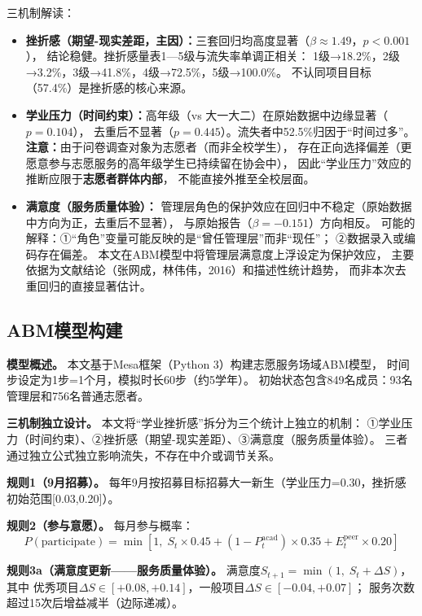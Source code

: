 \documentclass[12pt,a4paper]{article}
\begin{document}
三机制解读：
\begin{itemize}
\item \textbf{挫折感（期望-现实差距，主因）：}三套回归均高度显著（$\beta\approx1.49$，$p<0.001$），
结论稳健。挫折感量表1—5级与流失率单调正相关：
1级→18.2\%，2级→3.2\%，3级→41.8\%，4级→72.5\%，5级→100.0\%。
不认同项目目标（57.4\%）是挫折感的核心来源。
\item \textbf{学业压力（时间约束）：}高年级（vs 大一大二）在原始数据中边缘显著（$p=0.104$），
去重后不显著（$p=0.445$）。流失者中52.5\%归因于“时间过多”。
\textbf{注意：}由于问卷调查对象为志愿者（而非全校学生），
存在正向选择偏差（更愿意参与志愿服务的高年级学生已持续留在协会中），
因此“学业压力”效应的推断应限于\textbf{志愿者群体内部}，
不能直接外推至全校层面。
\item \textbf{满意度（服务质量体验）：}
管理层角色的保护效应在回归中不稳定（原始数据中方向为正，去重后不显著），
与原始报告（$\beta=-0.151$）方向相反。
可能的解释：①“角色”变量可能反映的是“曾任管理层”而非“现任”；
②数据录入或编码存在偏差。
本文在ABM模型中将管理层满意度上浮设定为保护效应，
主要依据为文献结论（张网成，林伟伟，2016）和描述性统计趋势，
而非本次去重回归的直接显著估计。
\end{itemize}

\subsection{ABM模型构建}

\textbf{模型概述。}
本文基于Mesa框架（Python 3）构建志愿服务场域ABM模型，
时间步设定为1步=1个月，模拟时长60步（约5学年）。
初始状态包含849名成员：93名管理层和756名普通志愿者。

\textbf{三机制独立设计。}
本文将“学业挫折感”拆分为三个统计上独立的机制：
①学业压力（时间约束）、②挫折感（期望-现实差距）、③满意度（服务质量体验）。
三者通过独立公式独立影响流失，不存在中介或调节关系。

\textbf{规则1（9月招募）。}
每年9月按招募目标招募大一新生（学业压力=0.30，挫折感初始范围[0.03,0.20]）。

\textbf{规则2（参与意愿）。}
每月参与概率：
\begin{equation}
P(\text{participate}) = \min\left[1,\; S_t\times 0.45 + (1-P_t^{\text{acad}})\times 0.35 + E_t^{\text{peer}}\times 0.20\right]
\end{equation}

\textbf{规则3a（满意度更新——服务质量体验）。}
满意度$S_{t+1} = \min(1,\; S_t + \Delta S)$，其中
优秀项目$\Delta S\in[+0.08,+0.14]$，一般项目$\Delta S\in[-0.04,+0.07]$；
服务次数超过15次后增益减半（边际递减）。
\end{document}

